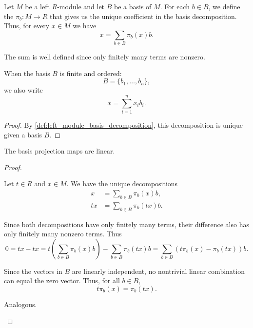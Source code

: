 \begin{definition}\label{def:left_module_basis_projection}
  Let \( M \) be a left \( R \)-module and let \( B \) be a basis of \( M \). For each \( b \in B \), we define the  \( \pi_b: M \to R \) that gives us the unique coefficient in the basis decomposition. Thus, for every \( x \in M \) we have
  \begin{equation*}
    x = \sum_{b \in B} \pi_b(x) b.
  \end{equation*}

  The sum is well defined since only finitely many terms are nonzero.

  When the basis \( B \) is finite and ordered:
  \begin{equation*}
    B = \{ b_1, \ldots, b_n \},
  \end{equation*}
  we also write
  \begin{equation*}
    x = \sum_{i=1}^n x_i b_i.
  \end{equation*}
\end{definition}
\begin{proof}
  By \cref{def:left_module_basis_decomposition}, this decomposition is unique given a basis \( B \).
\end{proof}

\begin{proposition}\label{thm:left_module_basis_projections_are_linear}
  The basis projection maps are linear.
\end{proposition}
\begin{proof}\mbox{}
  \begin{description}
     Let \( t \in R \) and \( x \in M \). We have the unique decompositions
    \begin{align*}
      x &= \sum_{b \in B} \pi_b(x) b, \\
      tx &= \sum_{b \in B} \pi_b(tx) b.
    \end{align*}

    Since both decompositions have only finitely many terms, their difference also has only finitely many nonzero terms. Thus
    \begin{equation*}
      0
      =
      tx - tx
      =
      t \left( \sum_{b \in B} \pi_b(x) b \right) - \sum_{b \in B} \pi_b(tx) b
      =
      \sum_{b \in B} (t \pi_b(x) - \pi_b(tx)) b.
    \end{equation*}

    Since the vectors in \( B \) are linearly independent, no nontrivial linear combination can equal the zero vector. Thus, for all \( b \in B \),
    \begin{equation*}
      t \pi_b(x) = \pi_b(tx).
    \end{equation*}

     Analogous.
  \end{description}
\end{proof}

